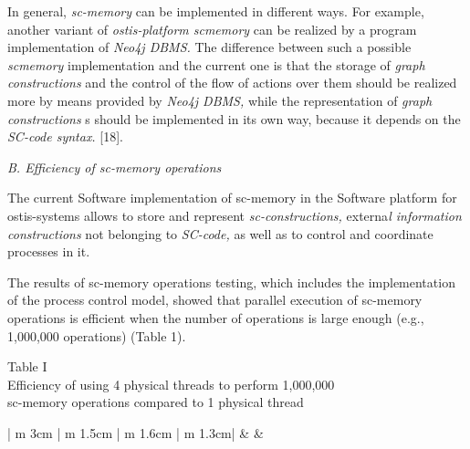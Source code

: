 \documentclass{article}
\begin{document}
\begin{multicols}{2}
In general, \textit{sc-memory}  can be implemented in different
ways. For example, another variant of \textit{ostis-platform scmemory} can be realized by a program implementation of \textit{Neo4j DBMS.} The difference between such a possible \textit{scmemory} implementation and the current one is that the
storage of \textit{graph constructions} and the control of the flow
of actions over them should be realized more by means
provided by \textit{Neo4j DBMS,}  while the representation of \textit{graph constructions} s should be implemented in its own
way, because it depends on the \textit{SC-code syntax.}  [18].

\textit{B. Efficiency of sc-memory operations}

The current Software implementation of sc-memory
in the Software platform for ostis-systems allows to
store and represent \textit{sc-constructions,}  externa\textit{l information
constructions }  not belonging to \textit{ SC-code,}  as well as to
control and coordinate processes in it.

The results of sc-memory operations testing, which
includes the implementation of the process control model,
showed that parallel execution of sc-memory operations
is efficient when the number of operations is large
enough (e.g., 1,000,000 operations) (Table 1).

\begin{center}
\small Table I \\ Efficiency of using 4 physical threads to perform 1,000,000 \\ sc-memory operations compared to 1 physical thread
\end{center}

\begin{center}
\begin{tabular}{ | m { 3cm } | m { 1.5cm } | m { 1.6cm } | m {1.3cm}|}  
  \hline 
 & &   \\


\end{tabular}
\end{center}
\end{multicols}
\end{document}
